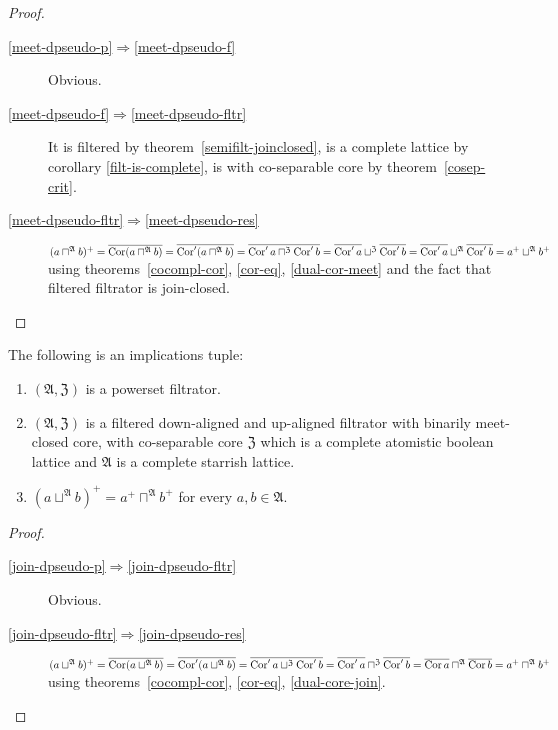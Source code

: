 \begin{proof}
~
\begin{description}
\item [\ref{meet-dpseudo-p}$\Rightarrow$\ref{meet-dpseudo-f}] Obvious.
\item [\ref{meet-dpseudo-f}$\Rightarrow$\ref{meet-dpseudo-fltr}]
It is filtered by theorem~\ref{semifilt-joinclosed},
is a complete lattice by corollary \ref{filt-is-complete},
is with co-separable core by theorem~\ref{cosep-crit}.
\item [\ref{meet-dpseudo-fltr}$\Rightarrow$\ref{meet-dpseudo-res}]
$(a\sqcap^{\mathfrak{A}}b)^{+}=
\overline{\operatorname{Cor}(a\sqcap^{\mathfrak{A}}b)} =
\overline{\operatorname{Cor}'(a\sqcap^{\mathfrak{A}}b)} =
\overline{\operatorname{Cor}' a\sqcap^{\mathfrak{Z}}\operatorname{Cor}' b} =
\overline{\operatorname{Cor}'a}\sqcup^{\mathfrak{Z}}\overline{\operatorname{Cor}'b}=
\overline{\operatorname{Cor}'a}\sqcup^{\mathfrak{A}}\overline{\operatorname{Cor}'b}=
a^{+}\sqcup^{\mathfrak{A}}b^{+}$
using theorems~\ref{cocompl-cor}, \ref{cor-eq}, \ref{dual-cor-meet} and the fact that filtered filtrator is join-closed.
\end{description}
\end{proof}

\begin{thm}
The following is an implications tuple:
\begin{enumerate}
\item \label{join-dpseudo-p}$(\mathfrak{A},\mathfrak{Z})$ is a powerset filtrator.
\item \label{join-dpseudo-fltr} $(\mathfrak{A},\mathfrak{Z})$ is a filtered
down-aligned and up-aligned filtrator with binarily meet-closed core, with co-separable core $\mathfrak{Z}$
which is a complete atomistic boolean lattice and $\mathfrak{A}$ is a complete
starrish lattice.
\item \label{join-dpseudo-res}$(a\sqcup^{\mathfrak{A}}b)^{+}=a^{+}\sqcap^{\mathfrak{A}}b^{+}$
for every $a,b\in\mathfrak{A}$.
\end{enumerate}
\end{thm}

\begin{proof}
~
\begin{description}
\item [\ref{join-dpseudo-p}$\Rightarrow$\ref{join-dpseudo-fltr}] Obvious.
\item [\ref{join-dpseudo-fltr}$\Rightarrow$\ref{join-dpseudo-res}]
$(a\sqcup^{\mathfrak{A}}b)^{+}=
\overline{\operatorname{Cor}(a\sqcup^{\mathfrak{A}}b)} =
\overline{\operatorname{Cor}'(a\sqcup^{\mathfrak{A}}b)} =
\overline{\operatorname{Cor}'a\sqcup^{\mathfrak{Z}}\operatorname{Cor}'b} =
\overline{\operatorname{Cor}'a}\sqcap^{\mathfrak{Z}}\overline{\operatorname{Cor}'b} =
\overline{\operatorname{Cor} a}\sqcap^{\mathfrak{A}}\overline{\operatorname{Cor} b} =
a^{+}\sqcap^{\mathfrak{A}}b^{+}$
using theorems~\ref{cocompl-cor}, \ref{cor-eq}, \ref{dual-core-join}.
\end{description}
\end{proof}

